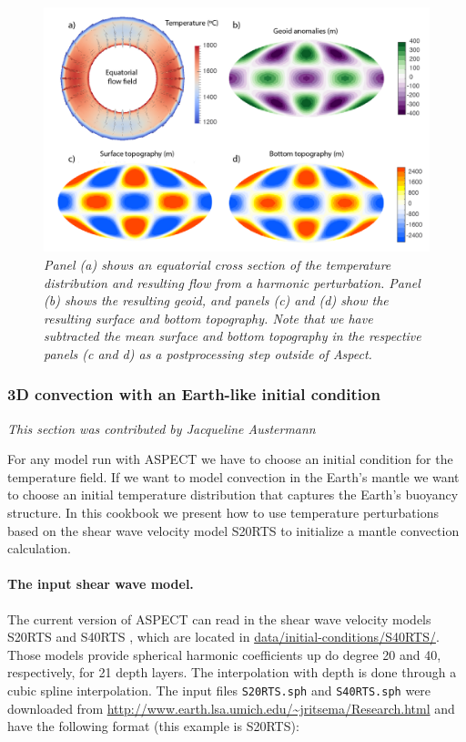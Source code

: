 \documentclass{article}
\newcommand{\aspect}{\textsc{ASPECT}}
\begin{document}
\begin{figure}
  \includegraphics[width=\textwidth]{cookbooks/shell_3d_postprocess/postprocess_cookbook-01.png}
  \hfill
  \caption{\it Panel (a) shows an equatorial cross section of the temperature distribution and 
  resulting flow from a harmonic perturbation. Panel (b) shows the resulting geoid, and panels
  (c) and (d) show the resulting surface and bottom topography. Note that we have subtracted
  the mean surface and bottom topography in the respective panels (c and d) as a postprocessing
  step outside of Aspect.
  }
  \label{fig:pp}
\end{figure}

\subsubsection{3D convection with an Earth-like initial condition}
\label{sec:cookbooks-S20RTS}
\textit{This section was contributed by Jacqueline Austermann}

For any model run with \aspect{} we have to choose an initial condition for the 
temperature field. If we want to model convection in the Earth's mantle we want 
to choose an initial temperature distribution that captures the Earth's buoyancy 
structure. In this cookbook we present how to use temperature perturbations 
based on the shear wave velocity model S20RTS \cite{S20RTS} to 
initialize a mantle convection calculation.

\paragraph{The input shear wave model.}

The current version of \aspect{} can read in the shear wave velocity models 
S20RTS \cite{S20RTS} and S40RTS \cite{S40RTS}, which are located 
in \url{data/initial-conditions/S40RTS/}. Those models provide 
spherical harmonic coefficients up do degree 20 and 40, respectively, for 21 
depth layers. The interpolation with depth is done through a cubic spline 
interpolation. The input files \texttt{S20RTS.sph} and \texttt{S40RTS.sph} were
downloaded from \url{http://www.earth.lsa.umich.edu/~jritsema/Research.html} 
and have the following format (this example is S20RTS): 
\end{document}
